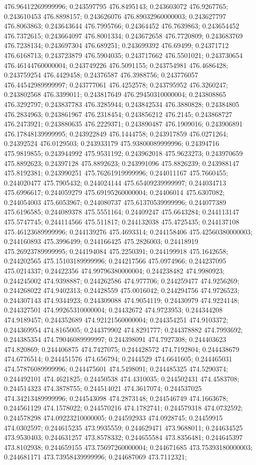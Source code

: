 476.96412269999996; 0.243597795 476.8495143; 0.243603072 476.9267765; 0.243610453 476.8898157; 0.243626076 476.89032960000003; 0.243627797 476.8063863; 0.243643644 476.7995766; 0.24364452 476.7639863; 0.243654452 476.7372615; 0.243664097 476.8001334; 0.243672658 476.7720809; 0.243683769 476.7238134; 0.243697304 476.689251; 0.243699392 476.69499; 0.24371712 476.6168713; 0.243723879 476.5904035; 0.243717662 476.5501021; 0.243730654 476.46144760000004; 0.243749226 476.5091155; 0.243754981 476.4686428; 0.243759254 476.4429458; 0.24376587 476.3988756; 0.243776057 476.44542989999997; 0.243777061 476.4252578; 0.243795952 476.3260247; 0.243802568 476.3399011; 0.243817649 476.29450310000004; 0.243808865 476.3292797; 0.243837783 476.3285944; 0.243842534 476.3880828; 0.24384805 476.2834963; 0.243861967 476.2318454; 0.243856212 476.2145; 0.243868727 476.2473921; 0.243880635 476.2229371; 0.243890487 476.1909016; 0.243906891 476.17848139999995; 0.243922849 476.1444758; 0.243917859 476.0271264; 0.24392524 476.0129503; 0.243933179 475.93800089999996; 0.24394716 475.9819855; 0.243944992 475.9531192; 0.243962018 475.9623273; 0.243970659 475.8892623; 0.24397128 475.8892623; 0.243991096 475.8826239; 0.243988147 475.8192381; 0.243990251 475.76261919999996; 0.244011167 475.7660455; 0.244020477 475.7905432; 0.244024144 475.65409239999997; 0.244034713 475.6996617; 0.244059279 475.69195260000004; 0.24406014 475.6307082; 0.244054003 475.6053967; 0.244080737 475.61370539999996; 0.244077389 475.6196585; 0.244089378 475.5551164; 0.24409247 475.6643284; 0.244113147 475.5747745; 0.244114566 475.511817; 0.244132038 475.4725435; 0.244137108 475.46123689999996; 0.244139276 475.4693314; 0.244158406 475.42560380000003; 0.244160893 475.3996499; 0.244166425 475.2826003; 0.24418919 475.26923789999995; 0.244194084 475.2250391; 0.244199918 475.1642658; 0.244202565 475.15103189999996; 0.244217566 475.0974966; 0.244237095 475.0214337; 0.24422356 474.99796380000004; 0.244238482 474.9980923; 0.244245002 474.9398887; 0.244262586 474.977706; 0.244259477 474.9256269; 0.244268022 474.9402313; 0.24428559 475.0016042; 0.244294756 474.9726523; 0.244307143 474.9344923; 0.244309088 474.9054119; 0.24430979 474.9224148; 0.244327501 474.99265310000004; 0.24432672 474.9723953; 0.244344208 474.9189457; 0.244352689 474.92121560000004; 0.244354251 474.9103372; 0.244369954 474.8165005; 0.244379902 474.8291777; 0.244378882 474.7993692; 0.244385354 474.79046089999997; 0.244398091 474.7927308; 0.244403623 474.820869; 0.244406875 474.7427075; 0.244428572 474.7192804; 0.244438679 474.6776514; 0.244451576 474.656794; 0.2444529 474.6641605; 0.244465031 474.57876089999996; 0.244475601 474.5498091; 0.244485325 474.5290374; 0.244492101 474.4621825; 0.24450538 474.4310035; 0.244502431 474.4583708; 0.244514323 474.3878755; 0.244514021 474.3617074; 0.244537025 474.34213489999996; 0.244543098 474.2873148; 0.244546749 474.1663678; 0.244561129 474.1578022; 0.244570216 474.1782741; 0.244579318 474.0732592; 0.244578298 474.09223210000005; 0.244592933 474.0928745; 0.24459915 474.0302597; 0.244615235 473.9935559; 0.244629471 473.9688011; 0.244634525 473.9530403; 0.244631257 473.8578332; 0.244655584 473.8356481; 0.244645397 473.8102938; 0.244659155 473.75697260000004; 0.244671685 473.75393180000003; 0.244681171 473.73958439999996; 0.244687069 473.7112321; 